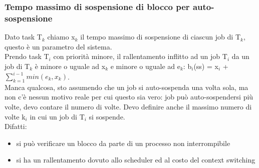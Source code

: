 \documentclass{article}
\begin{document}
\subsubsection{Tempo massimo di sospensione di blocco per auto-sospensione}
Dato task T$_{k}$ chiamo x$_{k}$ il tempo massimo di sospensione di ciascun job di T$_{k}$, questo è un parametro del sistema.\\ Prendo task T$_{i}$ con priorità minore, il rallentamento inflitto ad un job T$_{i}$ da un job di T$_{k}$ è minore o uguale ad x$_{k}$ e minore o uguale ad e$_{k}$:
b$_{i}$(ss) = x$_{i}$ + $\sum\limits_{k = 1}^{i-1}min(e_{k}, x_{k})$.\\ Manca qualcosa, sto assumendo che un job si auto-sospenda una volta sola, ma non c'è nessun motivo reale per cui questo sia vero: job può auto-sospendersi più volte, devo contare il numero di volte. Devo definire anche il massimo numero di volte k$_{i}$ in cui un job di T$_{i}$ si sospende.\\ Difatti:
\begin{itemize}
\item si può verificare un blocco da parte di un processo non interrompibile
\item si ha un rallentamento dovuto allo scheduler ed al costo del context switching
\end{itemize}
\end{document}
